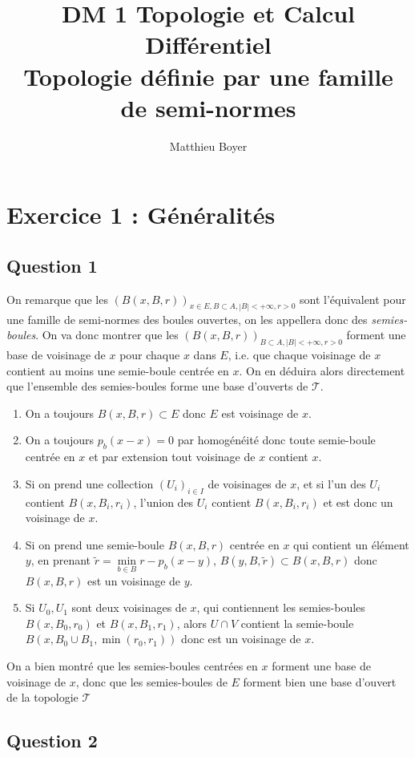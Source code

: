\documentclass{cours}
\title{DM 1 Topologie et Calcul Différentiel\\ \small Topologie définie par une famille de semi-normes}
\author{Matthieu Boyer}
\begin{document}
    \section{Exercice 1 : Généralités}
        \subsection{Question 1}
            On remarque que les $\left(B(x, B, r)\right)_{x\in E, B \subset A, \left|B\right|< +\infty, r > 0}$ sont l'équivalent pour une famille de semi-normes des boules ouvertes, on les appellera donc des \textsl{semies-boules}.
            On va donc montrer que les $\left(B(x, B, r)\right)_{B \subset A, \left|B\right|< +\infty, r > 0}$ forment une base de voisinage de $x$ pour chaque $x$ dans $E$, i.e. que chaque voisinage de $x$ contient au moins une semie-boule centrée en $x$. On en déduira alors directement que l'ensemble des semies-boules forme une base d'ouverts de $\mathcal{T}$.
            \begin{enumerate}
                \item On a toujours $B(x, B, r) \subset E$ donc $E$ est voisinage de $x$.
                \item On a toujours $p_{b}(x - x) = 0$ par homogénéité donc toute semie-boule centrée en $x$ et par extension tout voisinage de $x$ contient $x$.
                \item Si on prend une collection $(U_{i})_{i\in I}$ de voisinages de $x$, et si l'un des $U_i$ contient $B(x, B_{i}, r_{i})$, l'union des $U_{i}$ contient $B(x, B_{i}, r_{i})$ et est donc un voisinage de $x$.
                \item Si on prend une semie-boule $B(x, B, r)$ centrée en $x$ qui contient un élément $y$, en prenant $\tilde{r} = \min\limits_{b\in B}{r - p_{b}(x - y)}$, $B(y, B, \tilde{r}) \subset B(x, B, r)$ donc $B(x, B, r)$ est un voisinage de $y$.
                \item Si $U_{0}, U_{1}$ sont deux voisinages de $x$, qui contiennent les semies-boules $B(x, B_0, r_0)$ et $ B(x, B_1, r_1)$, alors $U \cap V$ contient la semie-boule $B(x, B_{0}\cup B_{1}, \min(r_{0}, r_{1}))$ donc est un voisinage de $x$.
            \end{enumerate}
            On a bien montré que les semies-boules centrées en $x$ forment une base de voisinage de $x$, donc que les semies-boules de $E$ forment bien une base d'ouvert de la topologie $\mathcal{T}$
        
        \subsection{Question 2}
\end{document}

